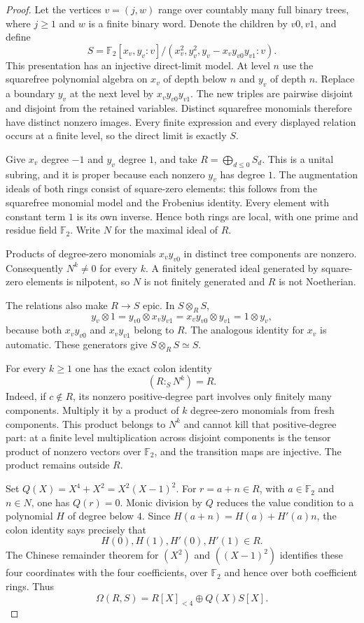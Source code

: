 \begin{proof}
Let the vertices $v=(j,w)$ range over countably many full binary
trees, where $j\ge1$ and $w$ is a finite binary word. Denote the
children by $v0,v1$, and define
\[
 S=\mathbb F_2[x_v,y_v:v]/(x_v^2,y_v^2,y_v-x_vy_{v0}y_{v1}:v).
\]
This presentation has an injective direct-limit model. At level
$n$ use the squarefree polynomial algebra on $x_v$ of depth below
$n$ and $y_v$ of depth $n$. Replace a boundary $y_v$ at the next
level by $x_vy_{v0}y_{v1}$. The new triples are pairwise disjoint
and disjoint from the retained variables. Distinct squarefree
monomials therefore have distinct nonzero images. Every finite
expression and every displayed relation occurs at a finite level,
so the direct limit is exactly $S$.

Give $x_v$ degree $-1$ and $y_v$ degree $1$, and take
$R=\bigoplus_{d\le0}S_d$. This is a unital subring, and it is proper
because each nonzero $y_v$ has degree $1$. The augmentation ideals
of both rings consist of square-zero elements: this follows from
the squarefree monomial model and the Frobenius identity. Every
element with constant term $1$ is its own inverse. Hence both
rings are local, with one prime and residue field $\mathbb F_2$.
Write $N$ for the maximal ideal of $R$.

Products of degree-zero monomials $x_vy_{v0}$ in distinct tree
components are nonzero. Consequently $N^k\ne0$ for every $k$.
A finitely generated ideal generated by square-zero elements is
nilpotent, so $N$ is not finitely generated and $R$ is not Noetherian.

The relations also make $R\to S$ epic. In $S\otimes_R S$,
\[
 y_v\otimes1
 =y_{v0}\otimes x_vy_{v1}
 =x_vy_{v0}\otimes y_{v1}
 =1\otimes y_v,
\]
because both $x_vy_{v0}$ and $x_vy_{v1}$ belong to $R$.
The analogous identity for $x_v$ is automatic. These generators
give $S\otimes_R S\simeq S$.

For every $k\ge1$ one has the exact colon identity
\[
                              (R:_S N^k)=R.
\]
Indeed, if $c\notin R$, its nonzero positive-degree part involves
only finitely many components. Multiply it by a product of $k$
degree-zero monomials from fresh components. This product belongs
to $N^k$ and cannot kill that positive-degree part: at a finite
level multiplication across disjoint components is the tensor
product of nonzero vectors over $\mathbb F_2$, and the transition
maps are injective. The product remains outside $R$.

Set $Q(X)=X^4+X^2=X^2(X-1)^2$. For $r=a+n\in R$, with
$a\in\mathbb F_2$ and $n\in N$, one has $Q(r)=0$. Monic division
by $Q$ reduces the value condition to a polynomial $H$ of degree
below $4$. Since
$H(a+n)=H(a)+H'(a)n$, the colon identity says precisely that
\[
                        H(0),H(1),H'(0),H'(1)\in R.
\]
The Chinese remainder theorem for $(X^2)$ and $((X-1)^2)$ identifies
these four coordinates with the four coefficients, over
$\mathbb F_2$ and hence over both coefficient rings. Thus
\begin{equation}\label{eq:forest-module-splitting}
                  \Omega(R,S)=R[X]_{<4}\oplus Q(X)S[X].
\end{equation}


\end{proof}
